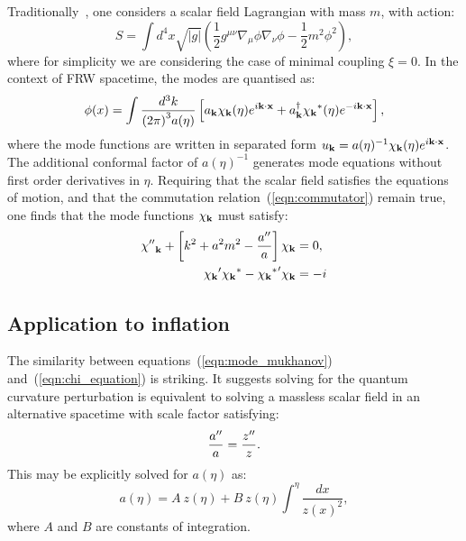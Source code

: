 Traditionally~\cite{Birrell+1984,Parker+2009}, one considers a scalar field Lagrangian with mass $m$, with action:
\begin{equation}
  S = \int d^4x \sqrt{|g|}\left( \frac{1}{2}g^{\mu\nu}\nabla_\mu\phi\nabla_\nu\phi - \frac{1}{2}m^2\phi^2 \right),
  \label{eqn:scalar_field}
\end{equation}
where for simplicity we are considering the case of minimal coupling $\xi=0$.  
In the context of FRW spacetime, the modes are quantised as:
\begin{equation}
  \phi(x) = \int\frac{d^3 k}{{(2\pi)}^3a(\eta)} \left[ a_{\mathbf{k}} \chi_{\mathbf{k}}(\eta)e^{i\mathbf{k}\cdot\mathbf{x}} + a_{\mathbf{k}}^{\dagger} {\chi_{\mathbf{k}}}^\ast(\eta)e^{-i\mathbf{k}\cdot\mathbf{x}} \right],
  \label{eqn:mode_expansion}
\end{equation}
where the mode functions are written in separated form $u_{\mathbf{k}} = a(\eta)^{-1}\chi_{\mathbf{k}}(\eta)e^{i \mathbf{k}\cdot\mathbf{x}}$. The additional conformal factor of $a(\eta)^{-1}$ generates mode equations without first order derivatives in $\eta$.
Requiring that the scalar field satisfies the equations of motion, and that the commutation relation~(\ref{eqn:commutator}) remain true,
one finds that the mode functions $\chi_{\mathbf{k}}$ must satisfy:
\begin{align}
  {{\chi}^{\prime\prime}}_{\mathbf{k}} + \left[ k^2 + a^2 m^2 - \frac{{{a}^{\prime\prime}}}{a}  \right] \chi_{\mathbf{k}} &= 0,
  \label{eqn:chi_equation}\\
  {{\chi_{\mathbf{k}}}^\prime} {\chi_{\mathbf{k}}}^\ast - {{{\chi_{\mathbf{k}}}^\ast}^\prime} \chi_{\mathbf{k}} &= -i
  \label{eqn:normalisation_1}
\end{align}

\subsection{Application to inflation}
\label{sec:bridge}
The similarity between equations~(\ref{eqn:mode_mukhanov}) and~(\ref{eqn:chi_equation}) is striking. It suggests solving for the quantum curvature perturbation is equivalent to solving a massless scalar field in an alternative spacetime with scale factor satisfying:
\begin{equation}
  \frac{{{a}^{\prime\prime}}}{a} = \frac{{{z}^{\prime\prime}}}{z}.
  \label{eqn:mapping}
\end{equation}
This may be explicitly solved for $a(\eta)$ as:
\begin{equation}
  a(\eta) = A\:z(\eta) + B\:z(\eta) \int^\eta \frac{dx}{{z(x)}^2},
  \label{eqn:a_sol}
\end{equation}
where $A$ and $B$ are constants of integration. 

